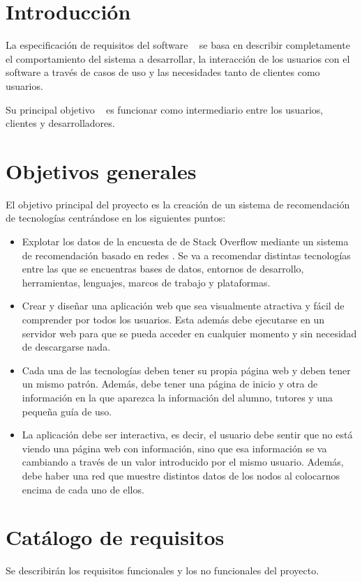 
\section{Introducción}
La especificación de requisitos del software  ~\cite{wiki:ers} se basa en describir completamente el comportamiento del sistema a desarrollar, la interacción de los usuarios con el software a través de casos de uso y las necesidades tanto de clientes como usuarios. 

Su principal objetivo ~\cite{wiki:ersobjetivo} es funcionar como intermediario entre los usuarios, clientes y desarrolladores.

\section{Objetivos generales}
El objetivo principal del proyecto es la creación de un sistema de recomendación de tecnologías \cite{ekstrand2011} centrándose en los siguientes puntos:

\begin{itemize}
    \item Explotar los datos de la encuesta de de Stack Overflow mediante un sistema de recomendación basado en redes \cite{aggarwal2016}. Se va a recomendar distintas tecnologías entre las que se encuentras bases de datos, entornos de desarrollo, herramientas, lenguajes, marcos de trabajo y plataformas.
    \item Crear y diseñar una aplicación web que sea visualmente atractiva y fácil de comprender por todos los usuarios. Esta además debe ejecutarse en un servidor web para que se pueda acceder en cualquier momento y sin necesidad de descargarse nada.
    \item Cada una de las tecnologías deben tener su propia página web y deben tener un mismo patrón. Además, debe tener una página de inicio y otra de información en la que aparezca la información del alumno, tutores y una pequeña guía de uso.
    \item La aplicación debe ser interactiva, es decir, el usuario debe sentir que no está viendo una página web con información, sino que esa información se va cambiando a través de un valor introducido por el mismo usuario. Además, debe haber una red que muestre distintos datos de los nodos al colocarnos encima de cada uno de ellos.
\end{itemize}


\section{Catálogo de requisitos}
Se describirán los requisitos funcionales y los no funcionales del proyecto.

